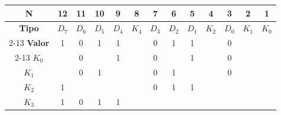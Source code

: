 \begin{center}
\begin{tabular}{ccccccccccccc}
\rowcolor[HTML]{FFFFC7} 
\cellcolor[HTML]{FCFF2F}\textbf{N}     & 12                        & 11                        & 10                        & 9                         & 8                        & 7                         & 6                         & 5                         & 4                        & 3                         & 2                        & 1                        \\ \hline
\rowcolor[HTML]{CBCEFB} 
\cellcolor[HTML]{9698ED}\textbf{Tipo}  & $D_7$                     & $D_6$                     & $D_5$                     & $D_4$                     & $K_4$                    & $D_3$                     & $D_2$                     & $D_1$                     & $K_2$                    & $D_0$                     & $K_1$                    & $K_0$                    \\ \cline{2-13} 
\rowcolor[HTML]{FFCCC9} 
\cellcolor[HTML]{FD6864}\textbf{Valor} & 1                         & 0                         & 1                         & 1                         &                          & 0                         & 1                         & 1                         &                          & 0                         &                          &                          \\ \cline{2-13} 
\cellcolor[HTML]{9AFF99}$K_0$          &                           & \cellcolor[HTML]{96FFFB}0 &                           & \cellcolor[HTML]{96FFFB}1 &                          & \cellcolor[HTML]{96FFFB}0 &                           & \cellcolor[HTML]{96FFFB}1 &                          & \cellcolor[HTML]{96FFFB}0 &                          & \cellcolor[HTML]{96FFFB} \\
\cellcolor[HTML]{9AFF99}$K_1$          &                           & \cellcolor[HTML]{96FFFB}0 & \cellcolor[HTML]{96FFFB}1 &                           &                          & \cellcolor[HTML]{96FFFB}0 & \cellcolor[HTML]{96FFFB}1 &                           &                          & \cellcolor[HTML]{96FFFB}0 & \cellcolor[HTML]{96FFFB} &                          \\
\cellcolor[HTML]{9AFF99}$K_2$          & \cellcolor[HTML]{96FFFB}1 &                           &                           &                           &                          & \cellcolor[HTML]{96FFFB}0 & \cellcolor[HTML]{96FFFB}1 & \cellcolor[HTML]{96FFFB}1 & \cellcolor[HTML]{96FFFB} &                           &                          &                          \\
\cellcolor[HTML]{9AFF99}$K_3$          & \cellcolor[HTML]{96FFFB}1 & \cellcolor[HTML]{96FFFB}0 & \cellcolor[HTML]{96FFFB}1 & \cellcolor[HTML]{96FFFB}1 & \cellcolor[HTML]{96FFFB} &                           &                           &                           &                          &                           &                          &                         
\end{tabular}
\end{center}
